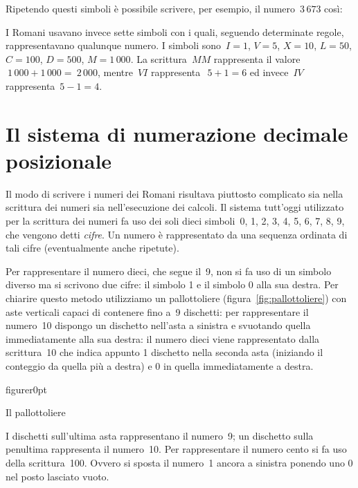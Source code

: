 
\vspace{-4ex}
Ripetendo questi simboli è possibile scrivere, per esempio, il numero~$3\,673$ così:

\vspace{-2ex}\vspace{-2ex}

I Romani usavano invece sette simboli con i quali, seguendo determinate regole,
rappresentavano qualunque numero. I simboli sono~$I=1$, $V=5$, $X=10$, $L=50$, $C=100$, $D=500$, $M=1\,000$.
La scrittura~$MM$ rappresenta il valore~$~1\,000+1\,000 =~2\,000$, mentre~$ VI$ rappresenta~$~5+1=6$ ed invece~$ IV$ rappresenta~$5-1=4$.

\section{Il sistema di numerazione decimale posizionale}
Il modo di scrivere i numeri dei Romani risultava piuttosto complicato sia nella scrittura
dei numeri sia nell'esecuzione dei calcoli. Il sistema tutt'oggi utilizzato per la scrittura dei numeri fa uso dei soli dieci simboli~0, 1, 2, 3, 4, 5, 6, 7, 8, 9, che vengono detti \emph{cifre}. Un numero è rappresentato da una sequenza ordinata di tali cifre (eventualmente anche ripetute).

Per rappresentare il numero dieci, che segue il~9, non si fa uso di un simbolo diverso ma si scrivono due cifre: il simbolo 1 e il simbolo 0 alla sua destra. Per chiarire questo metodo utilizziamo un pallottoliere (figura~\ref{fig:pallottoliere}) con aste verticali capaci di contenere fino a~9 dischetti: per rappresentare il numero~10 dispongo un dischetto nell'asta a sinistra e svuotando quella immediatamente alla sua destra: il numero dieci viene rappresentato dalla scrittura~10 che indica appunto 1 dischetto nella seconda asta (iniziando il conteggio da quella più a destra) e 0 in quella immediatamente a destra.

\begin{wrapfloat}{figure}{r}{0pt}

\caption{Il pallottoliere}
\label{fig:pallottoliere}
\end{wrapfloat}

I dischetti sull'ultima asta rappresentano il numero~9; un dischetto sulla penultima
rappresenta il numero~10. Per rappresentare il numero cento si fa uso della scrittura~100.
Ovvero si sposta il numero~1 ancora a sinistra ponendo uno 0 nel posto lasciato vuoto.

